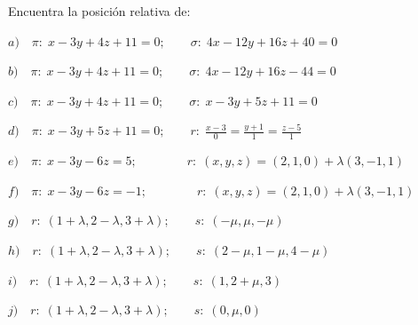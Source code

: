 \begin{ejre}
	Encuentra la posición relativa de:
	
	$a)\quad \pi:\; x-3y+4z+11=0; \qquad \sigma:\; 4x-12y+16z+40=0$
	
	$b)\quad \pi:\; x-3y+4z+11=0; \qquad \sigma:\; 4x-12y+16z-44=0$
	
	$c)\quad \pi:\; x-3y+4z+11=0; \qquad \sigma:\; x-3y+5z+11=0$
	
	$d)\quad \pi:\; x-3y+5z+11=0; \qquad r:\; \frac{x-3}{0}=\frac{y+1}{1}=\frac{z-5}{1}$
	
	$e)\quad \pi:\;x-3y-6z=5; \qquad \qquad r:\; (x,y,z)=(2,1,0)+\lambda(3,-1,1)$
	
	$f)\quad \pi:\;x-3y-6z=-1; \qquad \qquad r:\; (x,y,z)=(2,1,0)+\lambda(3,-1,1)$
	
	$g)\quad r:\; (1+\lambda,2-\lambda,3+\lambda);\qquad s:\; (-\mu, \mu, -\mu)$
	
	$h)\quad r:\; (1+\lambda,2-\lambda,3+\lambda);\qquad s:\; (2-\mu, 1-\mu, 4-\mu)$
	
	$i)\quad r:\; (1+\lambda,2-\lambda,3+\lambda);\qquad s:\; (1, 2+\mu, 3)$
	
	$j)\quad r:\; (1+\lambda,2-\lambda,3+\lambda);\qquad s:\; (0, \mu, 0)$
\end{ejre}

